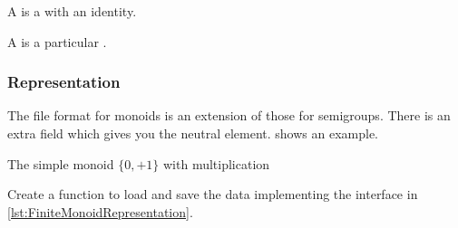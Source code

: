 

A \Monoid is a \Semigroup with an identity.


A \FiniteMonoid is a particular \FiniteSemigroup.


\subsubsection*{Representation}

The file format for monoids is an extension of those for semigroups.
There is an extra field  which gives you the neutral element.
 shows an example.

\begin{marginfigure}%
    \caption{The simple monoid $\{0,+1\}$ with multiplication}%
    \label{fig:monoid2}%
\end{marginfigure}%

\begin{codeexercise}
    Create a function to load and save the data implementing the
    interface in \cref{lst:FiniteMonoidRepresentation}.
\end{codeexercise}


